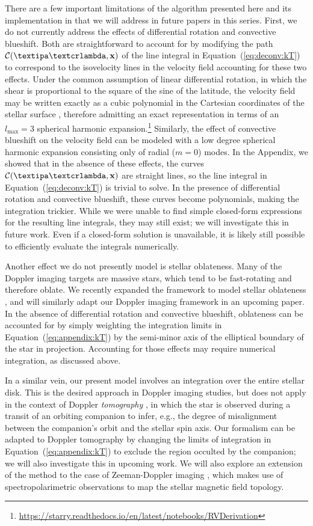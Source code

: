 \documentclass[modern]{aastex631}
\begin{document}
There are a few important limitations of the algorithm presented here and its implementation in \starry that we will address in future papers in this series.
First, we do not currently address the effects of differential rotation and convective blueshift.
Both are straightforward to account for by modifying the path $\mathcal{C}(\lnlam,\bvec{x})$ of the line integral in Equation~(\ref{eq:deconv:kT}) to correspond to the isovelocity lines in the velocity field accounting for these two effects.
Under the common assumption of linear differential rotation, in which the shear is proportional to the square of the sine of the latitude, the velocity field may be written exactly as a cubic polynomial in the Cartesian coordinates of the stellar surface \citep{Short2018}, therefore admitting an exact representation in terms of an $l_\mathrm{max} = 3$ spherical harmonic expansion.\footnote{\url{https://starry.readthedocs.io/en/latest/notebooks/RVDerivation}}
Similarly, the effect of convective blueshift on the velocity field can be modeled with a low degree spherical harmonic expansion consisting only of radial ($m = 0$) modes.
In the Appendix, we showed that in the absence of these effects, the curves $\mathcal{C}(\lnlam,\bvec{x})$ are straight lines, so the line integral in Equation~(\ref{eq:deconv:kT}) is trivial to solve.
In the presence of differential rotation and convective blueshift, these curves become polynomials, making the integration trickier.
While we were unable to find simple closed-form expressions for the resulting line integrals, they may still exist; we will investigate this in future work.
Even if a closed-form solution is unavailable, it is likely still possible to efficiently evaluate the integrals numerically.

Another effect we do not presently model is stellar oblateness.
Many of the Doppler imaging targets are massive stars, which tend to be fast-rotating and therefore oblate.
We recently expanded the \starry framework to model stellar oblateness \citet{Dholakia2021}, and will similarly adapt our Doppler imaging framework in an upcoming paper. 
In the absence of differential rotation and convective blueshift, oblateness can be accounted for by simply weighting the integration limits in Equation~(\ref{eq:appendix:kT}) by the semi-minor axis of the elliptical boundary of the star in projection. 
Accounting for those effects may require numerical integration, as discussed above.

In a similar vein, our present model involves an integration over the entire stellar disk. 
This is the desired approach in Doppler imaging studies, but does not apply in the context of Doppler \emph{tomography} \citep[e.g.,][]{Johnson2017}, in which the star is observed during a transit of an orbiting companion to infer, e.g., the degree of misalignment between the companion's orbit and the stellar spin axis.
Our formalism can be adapted to Doppler tomography by changing the limits of integration in Equation~(\ref{eq:appendix:kT}) to exclude the region occulted by the companion; we will also investigate this in upcoming work.
%
We will also explore an extension of the method to the case of Zeeman-Doppler imaging \citep{Marsh1988}, which makes use of spectropolarimetric observations to map the stellar magnetic field topology.
\end{document}
